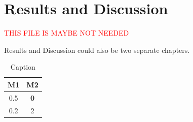 
\chapter{Results and Discussion}
\textcolor{red}{THIS FILE IS MAYBE NOT NEEDED}

Results and Discussion could also be two separate chapters. 

\begin{table}[htb]
    \centering
    \begin{tabular}{cc}
    \toprule 
         M1 & M2 \\ \midrule
       0.5  & \textbf{0}\\
        0.2 &  2\\
     \bottomrule
    \end{tabular}
    \caption{Caption}
    \label{tab:mse_results}
\end{table}